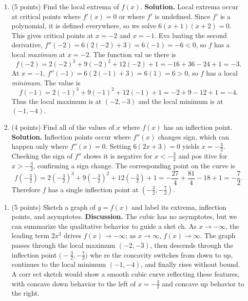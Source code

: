 \documentclass[12pt]{article}
\begin{document}
\begin{enumerate}[label=(\alph*)]\addtocounter{enumi}{2} %
    \item (5 points) Find the local extrema of $f(x)$.
    {\color{blue}\textbf{Solution.} Local extrema occur at critical points where $f'(x)=0$ or where $f'$ is undefined. Since $f'$
    is a polynomial, it is defined everywhere, so we solve $6(x+1)(x+2)=0$. This gives critical points at $x=-2$ and $x=-1$. Eva
    luating the second derivative, $f''(-2)=6(2(-2)+3)=6(-1)=-6<0$, so $f$ has a local \emph{maximum} at $x=-2$. The function val
    ue there is
    \[
        f(-2)=2(-2)^3+9(-2)^2+12(-2)+1=-16+36-24+1=-3.
    \]
    At $x=-1$, $f''(-1)=6(2(-1)+3)=6(1)=6>0$, so $f$ has a local \emph{minimum}. The value is
    \[
        f(-1)=2(-1)^3+9(-1)^2+12(-1)+1=-2+9-12+1=-4.
    \]
    Thus the local maximum is at $(-2,-3)$ and the local minimum is at $(-1,-4)$.}
    
    \item (4 points) Find all of the values of $x$ where $f(x)$ has an inflection point.
    {\color{blue}\textbf{Solution.} Inflection points occur where $f''(x)$ changes sign, which can happen only where $f''(x)=0$.
    Setting $6(2x+3)=0$ yields $x=-\tfrac{3}{2}$. Checking the sign of $f''$ shows it is negative for $x<-\tfrac{3}{2}$ and pos
    itive for $x>-\tfrac{3}{2}$, confirming a sign change. The corresponding point on the curve is
    \[
        f\!\left(-\tfrac{3}{2}\right)=2\left(-\tfrac{3}{2}\right)^3+9\left(-\tfrac{3}{2}\right)^2+12\left(-\tfrac{3}{2}\right)+1=-\frac{27}{4}+\frac{81}{4}-18+1=-\frac{7}{2}.
    \]
    Therefore $f$ has a single inflection point at $\left(-\tfrac{3}{2},-\tfrac{7}{2}\right)$.}
    
\end{enumerate}

\newpage

\begin{enumerate}[label=(\alph*)]\addtocounter{enumi}{4} %
    \item (5 points) Sketch a graph of $y=f(x)$ and label its extrema, inflection points, and asymptotes.
    {\color{blue}\textbf{Discussion.} The cubic has no asymptotes, but we can summarize the qualitative behavior to guide a sket
    ch. As $x\to -\infty$, the leading term $2x^3$ drives $f(x)\to -\infty$; as $x\to\infty$, $f(x)\to\infty$. The graph passes
     through the local maximum $(-2,-3)$, then descends through the inflection point $\big(-\tfrac{3}{2},-\tfrac{7}{2}\big)$ whe
    re the concavity switches from down to up, continues to the local minimum $(-1,-4)$, and finally rises without bound. A corr
    ect sketch would show a smooth cubic curve reflecting these features, with concave down behavior to the left of $x=-\tfrac{3}
    {2}$ and concave up behavior to the right.}
    
\end{enumerate}
\end{document}
